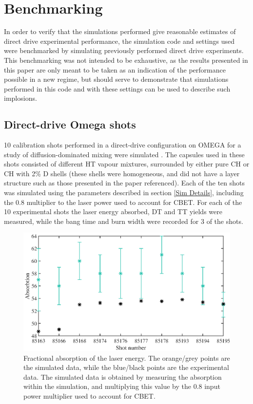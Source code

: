 \chapter{\label{app:benchmark} Benchmarking}

\minitoc

In order to verify that the simulations performed give reasonable estimates of direct drive experimental performance, the simulation code and settings used were benchmarked by simulating previously performed direct drive experiments. This benchmarking was not intended to be exhaustive, as the results presented in this paper are only meant to be taken as an indication of the performance possible in a new regime, but should serve to demonstrate that simulations performed in this code and with these settings can be used to describe such implosions.

\section{Direct-drive Omega shots}

10 calibration shots performed in a direct-drive configuration on OMEGA for a study of diffusion-dominated mixing were simulated \cite{Zylstra2018a}. The capsules used in these shots consisted of different HT vapour mixtures, surrounded by either pure CH or CH with 2\% D shells (these shells were homogeneous, and did not have a layer structure such as those presented in the paper referenced). Each of the ten shots was simulated using the parameters described in section \ref{Sim Details}, including the 0.8 multiplier to the laser power used to account for CBET. For each of the 10 experimental shots the laser energy absorbed, DT and TT yields were measured, while the bang time and burn width were recorded for 3 of the shots.

\begin{figure}[ht]
\centering
\includegraphics{figures/LowCR/BenchmarkOmegaAbsorbtion.eps}
\caption{Fractional absorption of the laser energy. The orange/grey points are the simulated data, while the blue/black points are the experimental data. The simulated data is obtained by measuring the absorption within the simulation, and multiplying this value by the 0.8 input power multiplier used to account for CBET.}
\label{fig:OmegaAbs}
\end{figure}

